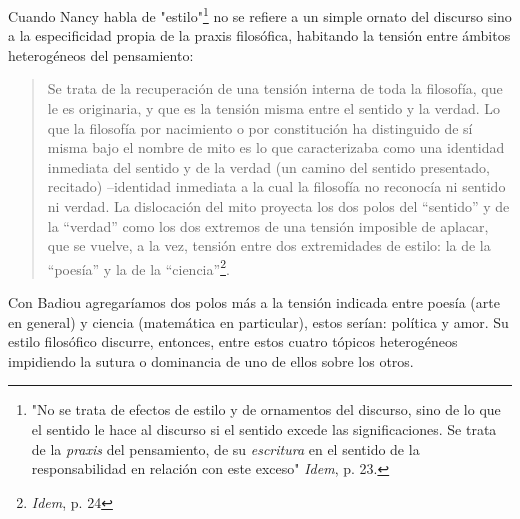 Cuando Nancy habla de "estilo"\footnote{"No se trata de efectos de
  estilo y de ornamentos del discurso, sino de lo que el sentido le hace
  al discurso si el sentido excede las significaciones. Se trata de la
  \emph{praxis} del pensamiento, de su \emph{escritura} en el sentido de
  la responsabilidad en relación con este exceso" \emph{Idem}, p. 23.}
no se refiere a un simple ornato del discurso sino a la especificidad
propia de la praxis filosófica, habitando la tensión entre ámbitos
heterogéneos del pensamiento:

\begin{quote}
Se trata de la recuperación de una tensión interna de toda la filosofía,
que le es originaria, y que es la tensión misma entre el sentido y la
verdad. Lo que la filosofía por nacimiento o por constitución ha
distinguido de sí misma bajo el nombre de mito es lo que caracterizaba
como una identidad inmediata del sentido y de la verdad (un camino del
sentido presentado, recitado) --identidad inmediata a la cual la
filosofía no reconocía ni sentido ni verdad. La dislocación del mito
proyecta los dos polos del ``sentido'' y de la ``verdad'' como los dos
extremos de una tensión imposible de aplacar, que se vuelve, a la vez,
tensión entre dos extremidades de estilo: la de la ``poesía'' y la de la
``ciencia''\footnote{\emph{Idem}, p. 24}.
\end{quote}

Con Badiou agregaríamos dos polos más a la tensión indicada entre poesía
(arte en general) y ciencia (matemática en particular), estos serían:
política y amor. Su estilo filosófico discurre, entonces, entre estos
cuatro tópicos heterogéneos impidiendo la sutura o dominancia de uno de
ellos sobre los otros.

